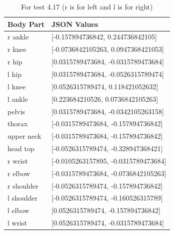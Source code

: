 \documentclass{scrreprt}
\begin{document}
\begin{table}[H]
    \centering
    \caption{For test 4.17 (r is for left and l is for right)}
    \begin{tabular}{||p{2cm}|p{6.5cm}||}
        \hline
        \textbf{Body Part} & \textbf {JSON Values}\\
         \hline\hline
        r ankle & [-0.157894736842, 0.244736842105] \\
        \hline
        r knee & [-0.0736842105263, 0.0947368421053] \\
        \hline
        r hip & [0.0315789473684, -0.0315789473684] \\
        \hline
        l hip & [0.0315789473684, -0.0526315789474] \\
        \hline
        l knee & [0.0526315789474, 0.118421052632] \\
        \hline
        l ankle & [0.223684210526, 0.0736842105263] \\
        \hline
        pelvis & [0.0315789473684, -0.0342105263158]\\
        \hline
        thorax & [-0.0315789473684, -0.157894736842] \\
        \hline
        upper neck & [-0.0315789473684, -0.157894736842] \\
        \hline
        head top & [-0.0526315789474, -0.328947368421] \\
        \hline
        r wrist & [-0.0105263157895, -0.0315789473684] \\
        \hline
        r elbow & [-0.0315789473684, -0.0736842105263] \\
        \hline
        r shoulder & [-0.0526315789474, -0.157894736842] \\
        \hline
        l shoulder & [-0.0526315789474, -0.160526315789]\\
        \hline
        l elbow & [0.0526315789474, -0.157894736842] \\
        \hline
        l wrist & [0.0526315789474, -0.0315789473684] \\
        \hline
    \end{tabular}
\end{table}
\end{document}
